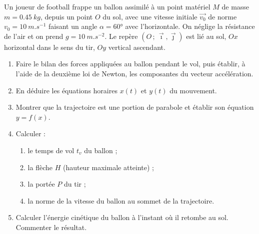 \documentclass[11pt]{article}
\begin{document}
\begin{exercice}
Un joueur de football frappe un ballon assimilé à un point matériel $M$ de masse $m = \SI{0,45}{kg}$, depuis un point $O$ du sol, avec une vitesse initiale $\vec{v_0}$ de norme $v_0 = \SI{10}{m.s^{-1}}$ faisant un angle $\alpha = 60°$ avec l'horizontale. On néglige la résistance de l'air et on prend $g = \SI{10}{m.s^{-2}}$. Le repère $(O\,;\,\vec{\imath},\vec{\jmath})$ est lié au sol, $Ox$ horizontal dans le sens du tir, $Oy$ vertical ascendant.
\begin{enumerate}
\item Faire le bilan des forces appliquées au ballon pendant le vol, puis établir, à l'aide de la deuxième loi de Newton, les composantes du vecteur accélération.
\item En déduire les équations horaires $x(t)$ et $y(t)$ du mouvement.
\item Montrer que la trajectoire est une portion de parabole et établir son équation $y = f(x)$.
\item Calculer :
\begin{enumerate}
\item le temps de vol $t_v$ du ballon ;
\item la flèche $H$ (hauteur maximale atteinte) ;
\item la portée $P$ du tir ;
\item la norme de la vitesse du ballon au sommet de la trajectoire.
\end{enumerate}
\item Calculer l'énergie cinétique du ballon à l'instant où il retombe au sol. Commenter le résultat.
\end{enumerate}
\end{exercice}
\end{document}
